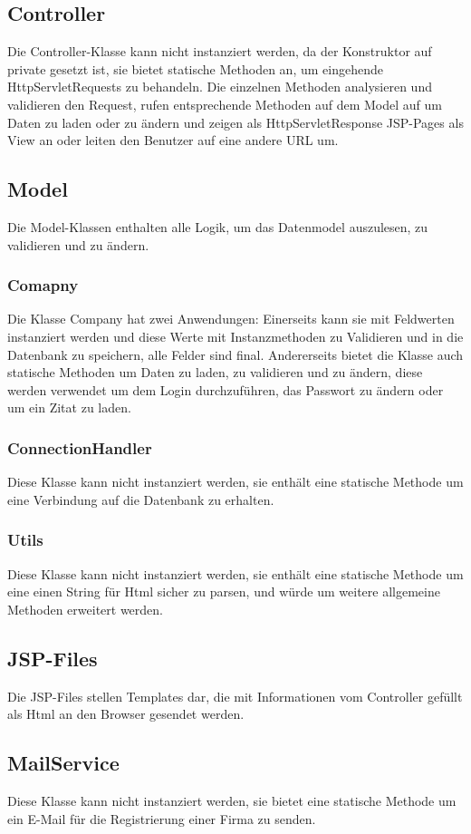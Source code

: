 \documentclass[12pt]{scrartcl}
\begin{document}
\subsection{Controller}
Die Controller-Klasse kann nicht instanziert werden, da der Konstruktor auf private gesetzt ist, sie bietet statische Methoden an, um eingehende HttpServletRequests zu behandeln. Die einzelnen Methoden analysieren  und validieren den Request, rufen entsprechende Methoden auf dem Model auf um Daten zu laden oder zu ändern und zeigen als HttpServletResponse JSP-Pages als View an oder leiten den Benutzer auf eine andere URL um.
\subsection{Model}
Die Model-Klassen enthalten alle Logik, um das Datenmodel auszulesen, zu validieren und zu ändern.
\subsubsection{Comapny}
Die Klasse Company hat zwei Anwendungen:
Einerseits kann sie mit Feldwerten instanziert werden und diese Werte mit Instanzmethoden zu Validieren und in die Datenbank zu speichern, alle Felder sind final.
Andererseits bietet die Klasse auch statische Methoden um Daten zu laden, zu validieren und zu ändern, diese werden verwendet um dem Login durchzuführen, das Passwort zu ändern oder um ein Zitat zu laden.
\subsubsection{ConnectionHandler}
Diese Klasse kann nicht instanziert werden, sie enthält eine statische Methode um eine Verbindung auf die Datenbank zu erhalten.
\subsubsection{Utils}
Diese Klasse kann nicht instanziert werden, sie enthält eine statische Methode um eine einen String für Html sicher zu parsen, und würde um weitere allgemeine Methoden erweitert werden.
\subsection{JSP-Files}
Die JSP-Files stellen Templates dar, die mit Informationen vom Controller gefüllt als Html an den Browser gesendet werden.
\subsection{MailService}
Diese Klasse kann nicht instanziert werden, sie bietet eine statische Methode um ein E-Mail für die Registrierung einer Firma zu senden.
\end{document}
